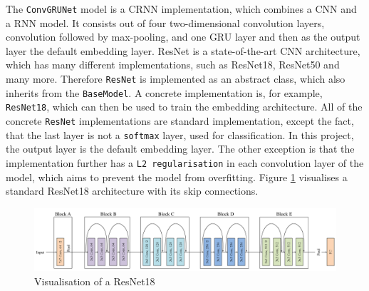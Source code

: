 \newline
\newline
The \texttt{ConvGRUNet} model is a \gls{CRNN} implementation, which combines a \gls{CNN} and a \gls{RNN} model. It consists out of four two-dimensional convolution layers, convolution followed by max-pooling, and one \gls{GRU} layer and then as the output layer the default embedding layer.
\newline
\newline
ResNet is a state-of-the-art \gls{CNN} architecture, which has many different implementations, such as ResNet18, ResNet50 and many more. Therefore \texttt{ResNet} is implemented as an abstract class, which also inherits from the \texttt{BaseModel}. A concrete implementation is, for example, \texttt{ResNet18}, which can then be used to train the embedding architecture. All of the concrete \texttt{ResNet} implementations are standard implementation, except the fact, that the last layer is not a \texttt{softmax} layer, used for classification. In this project, the output layer is the default embedding layer. The other exception is that the implementation further has a \texttt{L2 regularisation} in each convolution layer of the model, which aims to prevent the model from overfitting. Figure \ref{fig:ResNet18} visualises a standard ResNet18 architecture with its skip connections.
\begin{figure}[htbp]
	\centering
	\includegraphics[width=\linewidth]{img/ResNet18.png}
	\caption[Visualisation of a ResNet18]{Visualisation of a ResNet18 \footnotemark}
	\label{fig:ResNet18}
\end{figure}

